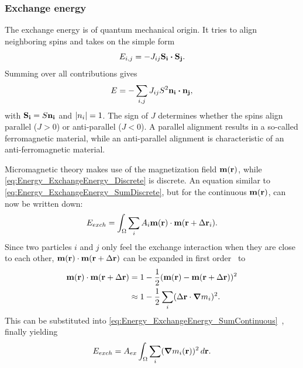 \documentclass[11pt,a4paper,english]{article}
\begin{document}
\subsubsection{Exchange energy}
\label{par:Energy_Exchange}
The exchange energy is of quantum mechanical origin. It tries to align neighboring spins and takes on the simple form
\begin{equation}
    E_{i,j} = -J_{ij} \vb{S_i} \vdot \vb{S_j} \mathrm{.}
    \label{eq:Energy_ExchangeEnergy_Discrete}
\end{equation}
Summing over all contributions gives
\begin{equation}
    E = -\sum_{i,j} J_{ij} S^2 \vb{n_i} \vdot \vb{n_j} \mathrm{,}
    \label{eq:Energy_ExchangeEnergy_SumDiscrete}
\end{equation}
with $\vb{S_i} = S \vb{n_i}$ and $\abs{n_i} = 1$. 
The sign of $J$ determines whether the spins align parallel ($J>0$) or anti-parallel ($J<0$). A parallel alignment results in a so-called ferromagnetic material, while an anti-parallel alignment is characteristic of an anti-ferromagnetic material. \par
Micromagnetic theory makes use of the magnetization field $\vb{m}(\vb{r})$, while \cref{eq:Energy_ExchangeEnergy_Discrete} is discrete. An equation similar to \cref{eq:Energy_ExchangeEnergy_SumDiscrete}, but for the continuous $\vb{m}(\vb{r})$, can now be written down:
\begin{equation}
    E_{exch} = \int_\Omega \sum_i A_i \vb{m}(\vb{r}) \cdot \vb{m}(\vb{r} + \Delta\vb{r}_i) \mathrm{.} \label{eq:Energy_ExchangeEnergy_SumContinuous}
\end{equation}
Since two particles $i$ and $j$ only feel the exchange interaction when they are close to each other, $\vb{m}(\vb{r}) \cdot \vb{m}(\vb{r} + \Delta\vb{r})$ can be expanded in first order~\cite{abert2013discrete} to
\begin{align*}
    \vb{m}(\vb{r}) \cdot \vb{m}(\vb{r} + \Delta\vb{r}) &= 1 - \frac{1}{2}(\vb{m}(\vb{r}) - \vb{m}(\vb{r} + \Delta\vb{r}))^2 \\
    &\approx 1 - \frac{1}{2}\sum_i(\Delta\vb{r} \cdot \gradient{m_i})^2 \label{eq:Energy_ExchangeEnergy_DotApprox} \mathrm{.}
\end{align*}
This can be substituted into \cref{eq:Energy_ExchangeEnergy_SumContinuous}~\cite{abert2013discrete,Gilbert1956}, finally yielding
\begin{equation}
    E_{exch} = A_{ex} \int_\Omega \sum_i (\gradient{m_i}(\vb{r}))^2 \, d\vb{r} \mathrm{.} \label{eq:Energy_Term_Exchange}
\end{equation}
\end{document}
